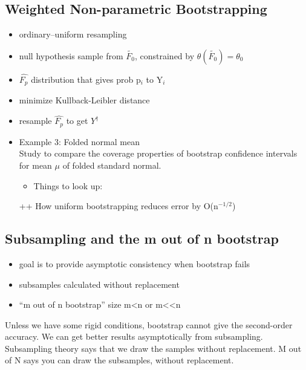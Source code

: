 \documentclass[bigger]{beamer}
\begin{document}
\subsection{Weighted Non-parametric Bootstrapping}
\label{sec-1-4}


\begin{itemize}
\item ordinary--uniform resampling
\item null hypothesis sample from $\tilde{F_0}$, constrained by
  $\theta(\tilde{F_0}) = \theta_0$
\item $\hat{F_p}$ distribution that gives prob p$_i$ to Y$_i$
\item minimize Kullback-Leibler distance
\item resample $\hat{F_p}$ to get $Y^\dag$
\end{itemize}
\begin{itemize}

\item Example 3: Folded normal mean\\
\label{sec-1-4-1}%
Study to compare the coverage properties of bootstrap confidence
intervals for mean $\mu$ of folded standard normal.



\begin{itemize}
\item Things to look up:
\end{itemize}
++ How uniform bootstrapping reduces error by O(n$^{\mathrm{-1/2}}$)


\end{itemize} %
\subsection{Subsampling and the m out of n bootstrap}
\label{sec-1-5}


\begin{itemize}
\item goal is to provide asymptotic consistency when bootstrap fails
\item subsamples calculated without replacement
\item ``m out of n bootstrap'' size m<n or m<<n
\end{itemize}

Unless we have some rigid conditions, bootstrap cannot give the
second-order accuracy. We can get better results asymptotically from
subsampling. Subsampling theory says that we draw the samples without
replacement. M out of N says you can draw the subsamples, without
replacement.  
\end{document}
